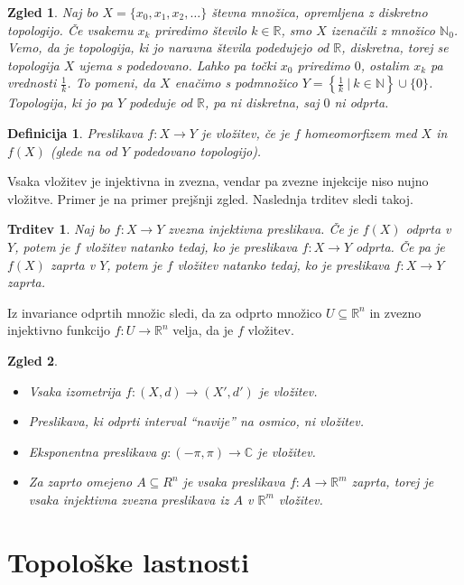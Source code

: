 \documentclass[10pt, a4paper]{article}
\newtheorem{trditev}[izr]{Trditev}
\newtheorem{defi}{Definicija}[section]
\newenvironment{noticeB}{%
  \tcolorbox[%
  notitle,
  empty,
  enhanced,  %
  breakable,
  coltext=black,
  colback=white, 
  fontupper=\rmfamily,
  parbox=false,
  noparskip,
  sharp corners,
  boxrule=-1pt,  %
  frame hidden,
  left=7pt,  %
  right=7pt,
  top=5pt,
  bottom=5pt,
  before skip=2.5ex plus 2pt,
  after skip=2.5ex plus 2pt,
  borderline west = {1.5pt}{-0.1pt}{blue!30!black}, %
  overlay unbroken and last={%
    \draw[color=black, line width=1.25pt]
    ($(frame.south west)+(1.pt, -0.1pt)$) -- ++(2em, 0);
  }
  ]}
{\endtcolorbox}
\newenvironment{definicija}{\begin{defi}\begin{noticeB}}{%
    \end{noticeB}\end{defi}}
\newtheorem{zgled}{Zgled}[section]
\newcommand{\N}{\mathbb {N}}
\newcommand{\R}{\mathbb {R}}
\newcommand{\C}{\mathbb {C}}
\begin{document}
\begin{zgled}
  Naj bo $X = \{x_0, x_1, x_2, \dots\}$ števna množica, opremljena z diskretno topologijo.
  Če vsakemu $x_k$ priredimo število $k \in \R$, smo $X$ izenačili z množico $\N_0$.
  Vemo, da je topologija, ki jo naravna števila podedujejo od $\R$, diskretna, torej se topologija $X$ ujema s podedovano.
  Lahko pa točki $x_0$ priredimo $0$, ostalim $x_k$ pa vrednosti $\frac{1}{k}$.
  To pomeni, da $X$ enačimo s podmnožico $Y = \left\lbrace\frac{1}{k}\ \Big|\ k \in \N \right\rbrace \cup \{0\}$.
  Topologija, ki jo pa $Y$ podeduje od $\R$, pa ni diskretna, saj $0$ ni odprta.
\end{zgled}

\begin{definicija}
  Preslikava $f: X \to Y$ je vložitev, če je $f$ homeomorfizem med $X$ in $f(X)$ (glede na od $Y$ podedovano topologijo).
\end{definicija}

Vsaka vložitev je injektivna in zvezna, vendar pa zvezne injekcije niso nujno vložitve.
Primer je na primer prejšnji zgled. Naslednja trditev sledi takoj.

\begin{trditev}
  Naj bo $f: X \to Y$ zvezna injektivna preslikava.
  Če je $f(X)$ odprta v $Y$, potem je $f$ vložitev natanko tedaj, ko je preslikava $f: X \to Y$ odprta.
  Če pa je $f(X)$ zaprta v $Y$, potem je $f$ vložitev natanko tedaj, ko je preslikava $f: X \to Y$ zaprta.
\end{trditev}

Iz invariance odprtih množic sledi, da za odprto množico $U \subseteq \R^n$ in zvezno injektivno
funkcijo $f: U \to \R^n$ velja, da je $f$ vložitev.

\begin{zgled}
  \begin{itemize}
    \item Vsaka izometrija $f: (X, d) \to (X', d')$ je vložitev.
    \item Preslikava, ki odprti interval "`navije"' na osmico, ni vložitev.
    \item Eksponentna preslikava $g: (-\pi, \pi) \to \C$ je vložitev.
    \item Za zaprto omejeno $A \subseteq R^n$ je vsaka preslikava $f: A \to \R^m$ zaprta,
    torej je vsaka injektivna zvezna preslikava iz $A$ v $\R^m$ vložitev.
  \end{itemize}
\end{zgled}
\clearpage
\section{Topološke lastnosti}
\end{document}
